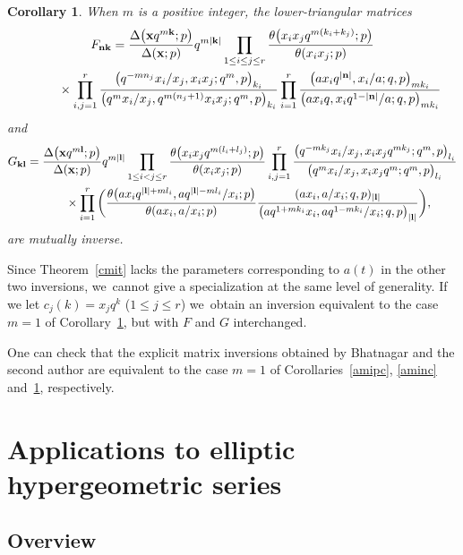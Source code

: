 \documentclass[pdftex]{sigma}%
\numberwithin{equation}{section}
\newtheorem{Corollary}[Theorem]{Corollary}
\newcommand\bn{\mathbf n}
\newcommand\bk{\mathbf k}
\newcommand\bl{\mathbf l}
\newcommand\bx{\mathbf x}
\begin{document}
\begin{Corollary}\label{bcmic}
When $m$ is a positive integer, the
lower-triangular matrices
\begin{gather*}
F_{\bf nk}=\frac{\Delta\big(\bx q^{m\bk};p\big)}{\Delta(\bx;p)} q^{m|\bk|}
\prod\limits_{1\leq i\leq j\leq r}\frac{\theta\big(x_ix_jq^{m(k_i+k_j)};p\big)}{\theta(x_ix_j;p)}
\\ \phantom{F_{\bf nk}=}{}
\times\prod\limits_{i,j=1}^r\frac{\big(q^{-mn_j}x_i/x_j,x_ix_j;q^m,p\big)_{k_i}}
{\big(q^mx_i/x_j,q^{m(n_j+1)}x_ix_j;q^m,p\big)_{k_i}}
\prod\limits_{i=1}^r\frac{\big(ax_iq^{|\bn|},x_i/a;q,p\big)_{mk_i}}{\big(ax_iq,x_iq^{1-|\bn|}/a;q,p\big)_{mk_i}}
\end{gather*}
and
\begin{gather*}
G_{\bf kl}=\frac{\Delta\big(\bx q^{m\bl};p\big)}{\Delta(\bx;p)}q^{m|\bl|}\prod\limits_{1\leq i<j\leq r}\frac{\theta\big(x_ix_jq^{m(l_i+l_j)};p\big)}{\theta(x_ix_j;p)}
\prod\limits_{i,j=1}^r\frac{\big(q^{-mk_j}x_i/x_j,x_ix_jq^{mk_j};q^m,p\big)_{l_i}}{\big(q^mx_i/x_j,x_ix_j q^m ;q^m,p\big)_{l_i}}
\\ \phantom{G_{\bf kl}=}{}
\times
\prod\limits_{i=1}^r\bigg(\frac{\theta\big(ax_iq^{|\bl|+ml_i},aq^{|\bl|-ml_i}/x_i;p\big)}
{\theta(ax_i,a/x_i;p)}\frac{(ax_i,a/x_i;q,p)_{|\bl|}}{\big(aq^{1+mk_i}x_i,aq^{1-mk_i}/x_i;q,p\big)_{|\bl|}}\bigg),
\end{gather*}
 are mutually inverse.
\end{Corollary}

Since
Theorem~\ref{cmit} lacks the parameters corresponding to $a(t)$ in the other two inversions, we~cannot give a specialization at the same level of generality. If we let
 $c_j(k)=x_jq^{k}$ ($1\leq j\leq r$) we~obtain an inversion equivalent to the case $m=1$ of Corollary~\ref{bcmic}, but with $F$ and $G$ interchanged.

One can check that the explicit matrix inversions obtained by Bhatnagar and the second author \cite[Corollaries~4.5, 5.8 and~9.6]{bs} are equivalent to the case $m=1$ of Corollaries~\ref{amipc}, \ref{aminc} and~\ref{bcmic}, respectively.

\section{Applications to elliptic hypergeometric series}\label{hss}

\subsection{Overview}
\end{document}
